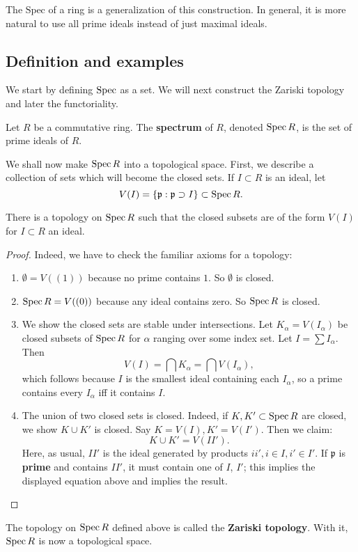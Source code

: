 The $\mathrm{Spec}$ of a ring is a generalization of this construction.
In general, it is more natural to 
use all prime ideals instead of just maximal ideals.
\subsection{Definition and examples}

We start by defining $\operatorname{Spec}$ as a set. We will next
construct the
Zariski topology and later the functoriality.
\begin{definition} 
Let $R$ be a commutative ring. The \textbf{spectrum} of $R$,
denoted $\operatorname{Spec} R$, is
the set of prime ideals of $R$.
\end{definition} 

We shall now make $\operatorname{Spec} R$ into a topological space. First, we
describe a
collection of sets which will become the closed sets. 
If $I \subset R$ is an ideal, let
\[ V(I) = \left\{\mathfrak{p}: \mathfrak{p} \supset I\right\}
\subset \operatorname{Spec} R.
\]

\begin{proposition} 
There is a topology on $\operatorname{Spec} R$ such that the closed subsets
are of the form
$V(I)$ for $I \subset R$ an ideal.
\end{proposition} 

\begin{proof} 
Indeed, we have to check the familiar axioms for a topology:
\begin{enumerate}
\item $\emptyset = V((1))$ because no prime contains $1$. So
$\emptyset$ is closed.
\item $\operatorname{Spec} R = V((0))$ because any ideal contains zero. So
$\operatorname{Spec} R$ is
closed.
\item We show the closed sets are stable under intersections.
Let
$K_{\alpha} = V(I_{\alpha})$ be closed subsets of $\operatorname{Spec} R$ for
$\alpha$
ranging over some index set.  Let $I
= \sum I_{\alpha}$. Then 
\[ V(I) = \bigcap K_{\alpha} = \bigcap V(I_{\alpha}),  \]
which follows because $I$ is the smallest ideal containing each
$I_{\alpha}$,
so a prime contains every $I_{\alpha}$ iff it contains $I$.  
\item The union of two closed sets is closed. Indeed, if $K,K'
\subset \operatorname{Spec}
R$ are closed, we show $K \cup K'$ is closed. Say $K= V(I), K' =
V(I')$. Then
we claim: 
\[ K \cup K'  = V(II').  \]
Here, as usual, $II'$ is the ideal generated by products $ii', i \in I, i'
\in I'$. If
$\mathfrak{p}$ is \textbf{prime} and contains $II'$, it must
contain one of $I$, $I'$;
this implies the displayed equation above and implies the
result.
\end{enumerate}
\end{proof} 
\begin{definition} 
The topology on $\operatorname{Spec} R$ defined above is called the
\textbf{Zariski
topology}. With it,  $\operatorname{Spec} R$ is now a topological space.
\end{definition} 

